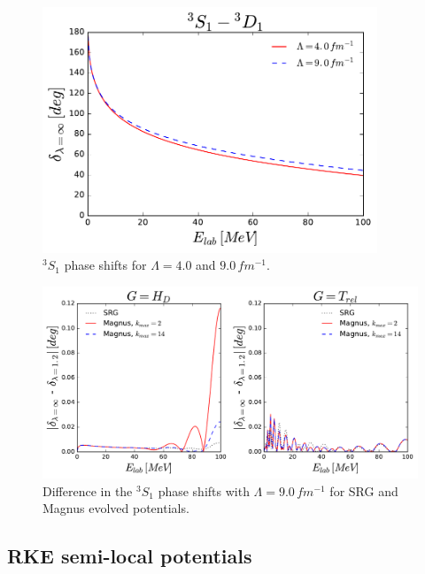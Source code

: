 \documentclass[preprintnumbers,floatfix,aps,prc,preprint]{revtex4-1}
\begin{document}
%
\begin{figure}[H]
  \centering
  \includegraphics[width=10cm]{initial_phase_shifts}
   \hspace*{0.05\textwidth}%
  \caption{$^{3}S_{1}$ phase shifts for $\Lambda=4.0$ and $9.0 \, fm^{-1}$.}
  \label{fig:initial_phase_shifts}
\end{figure}
%
\begin{figure}[H]
  \centering
  \includegraphics[width=15cm]{evolved_phase_shifts_diff}
   \hspace*{0.05\textwidth}%
  \caption{Difference in the $^{3}S_{1}$ phase shifts with $\Lambda=9.0 \, fm^{-1}$ for SRG and Magnus evolved potentials.}
  \label{fig:evolved_phase_shifts_diff}
\end{figure}

\subsection{RKE semi-local potentials}
\end{document}
